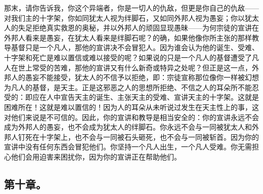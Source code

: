 那末，请你告诉我，你这个异端者，你是一切人的仇敌，但更是你自己的仇敌——对我们主的十字架，你如同犹太人视为绊脚石，又如同外邦人视为愚妄；你以犹太人的失足拒绝真实救恩的奥秘，并以外邦人的顽固显现愚昧——为何宗徒的宣讲在外邦人看来是愚妄，在犹太人看来是绊脚石呢？的确，如果他像你所主张的那样教导基督只是一个凡人，那他的宣讲决不会冒犯人。因为谁会认为他的诞生、受难、十字架和死亡是难以置信或难以接受的呢？如果说的只是一个凡人的基督遭受了凡人在世上常受的苦难，那他的宣讲又有什么新奇或特异之处呢？但正是这一点，外邦人的愚妄不能接受，犹太人的不信予以拒绝，即：宗徒宣称那位像你一样被幻想为凡人的基督，是天主。正是这邪恶之人的思想所拒绝、不信之人的耳朵所不能忍受的：即应在人中宣告天主的诞生、主张天主的受难、宣讲天主的十字架。这就是困难所在！这就是难以置信的！因为人的耳朵从未听说过发生在天主性上的事，这对他们来说是不可信的。因此，你的宣讲和教导是相当安全的：你的宣讲永远不会成为外邦人的愚妄，也不会成为犹太人的绊脚石。你永远不会与一同被犹太人和外邦人钉死在十字架上，也不会与一同被石头砸死，也不会与一同被斩首。因为你的宣讲中没有任何东西会冒犯他们。你坚持一个凡人出生，一个凡人受难。你无需担心他们会用迫害来困扰你，因为你的宣讲正在帮助他们。\par


\subsection{第十章。}

\par

